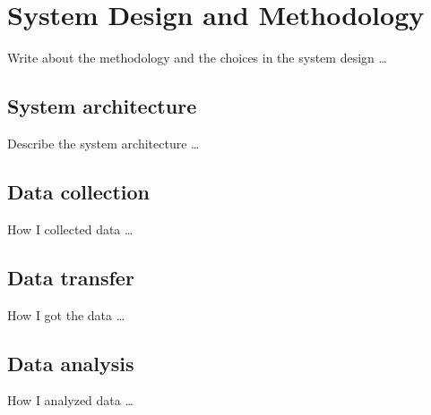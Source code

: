 \chapter{System Design and Methodology}
\label{cha:system}
\vspace{0.5 cm} 

Write about the methodology and the choices in the system design \dots


\vspace{0.5 cm} 
\section{System architecture}
\label{sec:sysarc}
\vspace{0.5 cm} 

Describe the system architecture \dots


\vspace{0.5 cm} 
\section{Data collection}
\label{sec:collection}
\vspace{0.5 cm} 

How I collected data \dots


\vspace{0.5 cm} 
\section{Data transfer}
\label{sec:transfer}
\vspace{0.5 cm} 

How I got the data \dots


\vspace{0.5 cm} 
\section{Data analysis}
\label{sec:analysis}
\vspace{0.5 cm} 

How I analyzed data \dots
